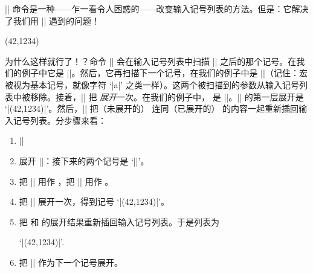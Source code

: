 \documentclass[a4paper,doc2]{ltxdoc}
\begin{document}
\begin{command}{\expandafter{}}
	|\expandafter| 命令是一种——乍一看令人困惑的——改变输入记号列表的方法。但是：它解决了我们用 |\point\temp| 遇到的问题！
\begin{codeexample}[]
\def\point(#1,#2){we do something with #1 and #2}
\def\temp{(42,1234)}
\expandafter\point\temp
\end{codeexample}
	为什么这样就行了！？命令 |\expandafter| 会在输入记号列表中扫描 |\expandafter| 之后的那个记号。在我们的例子中它是 |\point|。然后，它再扫描下一个记号，在我们的例子中是 |\temp|（记住：宏被视为基本记号，就像字符 `|a|' 之类一样）。这两个被扫描到的参数从输入记号列表中被移除。接着，|\expandafter| 把 \emph{展开}一次。在我们的例子中， 是 |\temp|。|\temp| 的第一层展开是 `|(42,1234)|'。然后，|\expandafter| 把（未展开的） 连同（已展开的） 的内容一起重新插回输入记号列表。分步骤来看：

	\begin{enumerate}
		\item |\expandafter\point\temp|
		\item 展开 |\expandafter|：接下来的两个记号是 `|\point\temp|'。
		\item 把 |\point| 用作 ，把 |\temp| 用作 。
		\item 把 |\temp| 展开一次，得到记号 `|(42,1234)|'。
		\item 把  和  的展开结果重新插回输入记号列表。于是列表为

			`|\point(42,1234)|'.
		\item 把 |\point| 作为下一个记号展开。
	\end{enumerate}


\end{command}
\end{document}
